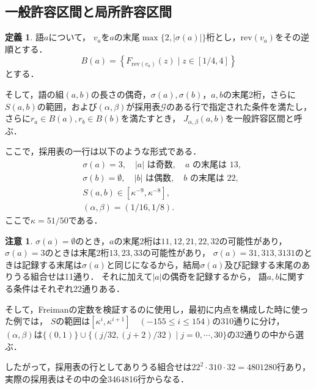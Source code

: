 \documentclass[10pt,a4paper]{ujarticle}
\theoremstyle{definition}
\newtheorem{definition}{定義}
\newtheorem{remark}{注意}
\begin{document}
\subsection{一般許容区間と局所許容区間}
\begin{definition}
    語$a$について，
    $v_a$を$a$の末尾$\max\{2, |\sigma(a)|\}$桁とし，$\mathrm{rev}(v_a)$をその逆順とする．
    \[
    B(a) = \left\{F_{\mathrm{rev}(v_a)}(z) \mid z \in [1/4,4]\right\}
    \]
    とする．

    そして，語の組$(a,b)$の長さの偶奇，$\sigma(a), \sigma(b)$，$a,b$の末尾2桁，さらに$S(a,b)$の範囲，および$(\alpha, \beta)$が採用表$\mathcal{G}$のある行で指定された条件を満たし，
    さらに$r_a \in B(a), r_b \in B(b)$を満たすとき，
    $J_{\alpha, \beta}(a, b)$を一般許容区間と呼ぶ．

    ここで，採用表の一行は以下のような形式である．
    \[
    \begin{aligned}
      &\sigma(a)=3,\quad |a|\text{ は奇数},\quad a\text{ の末尾は }13,\\
      &\sigma(b)=\emptyset,\quad |b|\text{ は偶数},\quad b\text{ の末尾は }22,\\
      &S(a,b) \in[\kappa^{-9},\kappa^{-8}],\\
      &(\alpha,\beta)=(1/16,1/8).
    \end{aligned}
    \]
    ここで$\kappa = 51/ 50$である．
\end{definition}
\begin{remark}
    $\sigma(a) = \emptyset$のとき，$a$の末尾2桁は$11, 12, 21, 22, 32$の可能性があり，
    $\sigma(a) = 3$のときは末尾2桁$13,23,33$の可能性があり，
    $\sigma(a) = 31, 313, 3131$のときは記録する末尾は$\sigma(a)$と同じになるから，結局$\sigma(a)$及び記録する末尾のありうる組合せは11通り．
    それに加えて$|a|$の偶奇を記録するから， 語$a, b$に関する条件はそれぞれ22通りある．

    そして，Freimanの定数を検証するのに使用し，最初に内点を構成した時に使った例では，
    $S$の範囲は$[\kappa^i, \kappa^{i+1}]\quad (-155 \le i \le 154)$の310通りに分け，
    $(\alpha, \beta)$は$\{(0,1)\}\cup \{(j/32, (j + 2) / 32) \mid j = 0,\cdots , 30\}$の32通りの中から選ぶ．
    
    したがって，採用表の行としてありうる組合せは$22^2\cdot 310 \cdot 32 = 4801280$行あり，実際の採用表はその中の全3464816行からなる．
\end{remark}
\end{document}
